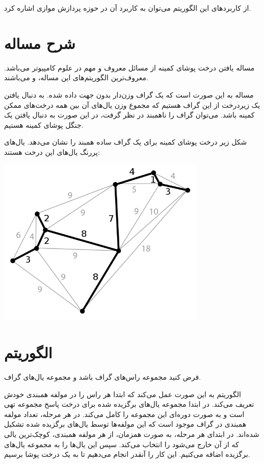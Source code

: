 \documentclass[11pt, oneside]{article}
\begin{document}
    از کاربردهای این الگوریتم می‌توان به کاربرد آن در حوزه پردازش موازی اشاره کرد.
    
    \section{شرح مساله}\label{شرح مساله}
    مساله یافتن درخت پوشای کمینه از مسائل معروف و مهم در علوم کامپیوتر می‌باشد. معروف‌ترین الگوریتم‌های این مساله،  \cite{c2} و  \cite{c3} می‌باشند.

    مساله به این صورت است که یک گراف وزن‌دار بدون جهت داده شده. به دنبال یافتن یک زیردرخت از این گراف هستیم که مجموع وزن یال‌های آن بین همه درخت‌های ممکن کمینه باشد.
    می‌توان گراف را ناهمبند در نظر گرفت، در این صورت به دنبال یافتن یک جنگل پوشای کمینه هستیم.
    
    شکل زیر درخت پوشای کمینه برای یک گراف ساده همبند را نشان می‌دهد. یال‌های پررنگ یال‌های این درخت هستند:
    \begin{center}
        \includegraphics[width=10cm]{resources/mst.svg.png}\\[\bigskipamount]
    \end{center}

    \pagebreak
    \section{الگوریتم}\label{الگوریتم}
    فرض کنید  مجموعه راس‌های گراف باشد و  مجموعه یال‌های گراف.

    الگوریتم به این صورت عمل می‌کند که ابتدا هر راس را در مولفه همبندی خودش تعریف می‌کند. در ابتدا مجموعه یال‌های برگزیده شده برای درخت پاسخ مجموعه تهی است و به صورت دوره‌ای
    این مجموعه را کامل می‌کند.
    در هر مرحله، تعداد مولفه همبندی در گراف موجود است که این مولفه‌ها توسط یال‌های برگزیده شده تشکیل شده‌اند.
    در ابتدای هر مرحله، به صورت همزمان، از هر مولفه همبندی، کوچک‌ترین یالی که از آن خارج می‌شود را انتخاب می‌کند.
    سپس این یال‌ها را به مجموعه یال‌های برگزیده اضافه می‌کنیم. این کار را آنقدر انجام می‌دهیم تا به یک درخت پوشا برسیم.
\end{document}
